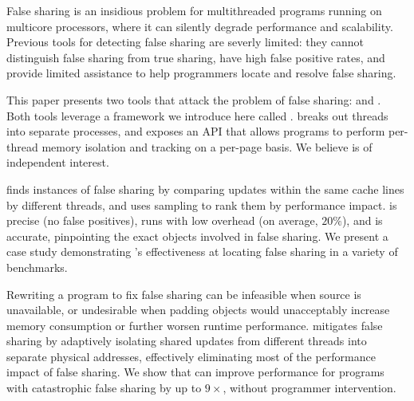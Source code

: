 False sharing is an insidious problem for multithreaded programs
running on multicore processors, where it can silently degrade
performance and scalability. Previous tools for detecting false
sharing are severly limited: they cannot distinguish false sharing
from true sharing, have high false positive rates, and provide limited
assistance to help programmers locate and resolve false sharing.

This paper presents two tools that attack the problem of false
sharing: \sheriffdetect{} and \sheriffprotect{}. Both tools leverage a
framework we introduce here called \sheriff{}. \sheriff{} breaks out
threads into separate processes, and exposes an API that allows
programs to perform per-thread memory isolation and tracking on a
per-page basis. We believe \sheriff{} is of independent interest.

\sheriffdetect{} finds instances of false sharing by comparing updates within
the same cache lines by different threads, and uses sampling to rank
them by performance impact. \sheriffdetect{} is precise (no false
positives), runs with low overhead (on average, $20\%$), and is
accurate, pinpointing the exact objects involved in false sharing. We
present a case study demonstrating \sheriffdetect{}'s effectiveness at
locating false sharing in a variety of benchmarks.

Rewriting a program to fix false sharing can be infeasible when source
is unavailable, or undesirable when padding objects would
unacceptably increase memory consumption or further worsen runtime
performance. \sheriffprotect{} mitigates false sharing by adaptively
isolating shared updates from different threads into separate physical
addresses, effectively eliminating most of the performance impact of
false sharing. We show that \sheriffprotect{} can improve
performance for programs with catastrophic false sharing by up to
$9\times$, without programmer intervention.


